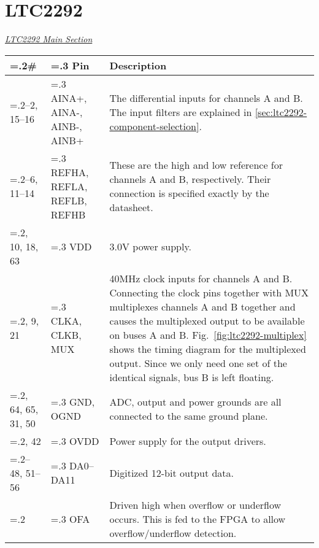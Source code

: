\section{LTC2292}
\label{sec:ltc2292-pinout}

\textit{\hyperref[sec:ltc2292]{LTC2292 Main Section}}

\label{tab:ltc2292-pinout}
\begin{tabularx}{\textwidth}{>{\hsize=.2\hsize}X >{\hsize=.3\hsize}X X}
        \caption{LTC2292 pinout.} \\
        \toprule
        \# & Pin & Description \\
        \midrule

        1--2, 15--16       & AINA+, AINA-, AINB-, AINB+ & The differential inputs for channels A and
        B. The input filters are explained in \cref{sec:ltc2292-component-selection}.           \\
        3--6, 11--14       & REFHA, REFLA, REFLB, REFHB & These are the high and low reference for
        channels A and B, respectively. Their connection is specified exactly by the datasheet. \\
        7, 10, 18, 63      & VDD                        & 3.0V power supply.                    \\
        8, 9, 21           & CLKA, CLKB, MUX            & 40MHz clock inputs for channels A and B. Connecting the clock
        pins together with MUX multiplexes channels A and B together and causes the multiplexed
        output to be available on buses A and B. Fig.~\ref{fig:ltc2292-multiplex} shows the timing
        diagram for the multiplexed output. Since we only need one set of the identical signals, bus
        B is left floating.                                                                    \\
        17, 64, 65, 31, 50 & GND, OGND                  & ADC, output and power grounds are all
        connected to the same ground plane.                                                    \\
        39, 42             & OVDD                       & Power supply for the output drivers. \\
        43--48, 51--56     & DA0--DA11                  & Digitized 12-bit output data.        \\
        57                 & OFA                        & Driven high when overflow or underflow
        occurs. This is fed to the FPGA to allow overflow/underflow detection.                 \\

\end{tabularx}
